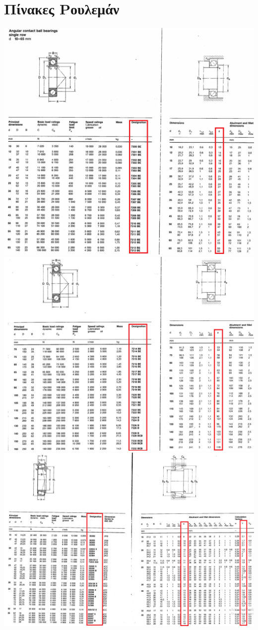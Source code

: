 \documentclass{article}
\begin{document}
\section{Πίνακες Ρουλεμάν}
\includegraphics[width=0.9\linewidth]{4.png}
\\
\includegraphics[width=0.9\linewidth]{5.png}
\\
\includegraphics[width=0.9\linewidth]{6.png}
\end{document}
